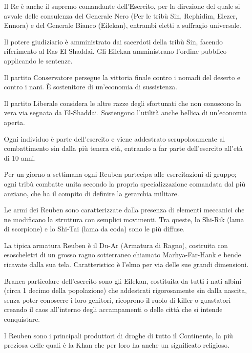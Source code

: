 Il Re \`e anche il supremo comandante dell'Esercito, per la direzione
del quale si avvale delle consulenza del Generale Nero (Per le trib\`u
Sin, Rephidim, Elezer, Ennora) e del Generale Bianco (Eilekan),
entrambi eletti a suffragio universale.

Il potere giudiziario \`e amministrato dai sacerdoti della trib\`u
Sin, facendo riferimento al Ras-El-Shaddai.  Gli Eilekan amministrano
l'ordine pubblico applicando le sentenze.

Il partito Conservatore persegue la vittoria finale contro i nomadi
del deserto e contro i nani. \`E sostenitore di un'economia di
sussistenza.

Il partito Liberale considera le altre razze degli sfortunati che non
conoscono la vera via segnata da El-Shaddai. Sostengono l'utilit\`a
anche bellica di un'economia aperta.


\Esercito Ogni individuo \`e parte dell'esercito e viene addestrato
scrupolosamente al combattimento sin dalla pi\`u tenera et\`a,
entrando a far parte dell'esercito all'et\`a di 10 anni. 

Per un giorno
a settimana ogni Reuben partecipa alle esercitazioni di gruppo; ogni
trib\`u combatte unita secondo la propria specializzazione comandata
dal pi\`u anziano, che ha il compito di definire la gerarchia
militare. 

Le armi dei Reuben sono caratterizzate dalla presenza di elementi
meccanici che ne modificano la struttura con semplici movimenti.  Tra
queste, lo Shi-Rik (lama di scorpione) e lo Shi-Tai (lama da coda) sono
le pi\`u diffuse.

La tipica armatura Reuben \`e il Du-Ar (Armatura di Ragno), costruita
con esoscheletri di un grosso ragno sotterraneo chiamato
Marhya-Far-Hank e bende ricavate dalla sua tela. Caratteristico \`e
l'elmo per via delle sue grandi dimensioni.

Branca particolare dell'esercito sono gli Eilekan, costituita da tutti
i nati albini (circa 1 decimo della popolazione) che addestrati
rigorosamente sin dalla nascita, senza poter conoscere i loro genitori,
ricoprono il ruolo di killer o guastatori creando il caos all'interno
degli accampamenti o delle citt\`a che si intende conquistare.

\Economia I Reuben sono i principali produttori di droghe di tutto il
Continente, la pi\`u preziosa delle quali \`e la Khan che per loro
ha anche un significato religioso. 

